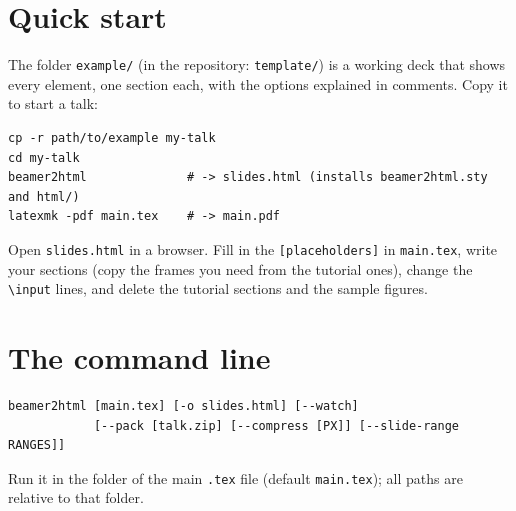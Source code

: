 \documentclass[a4paper,11pt]{article}
\newcommand\cs[1]{\texttt{\textbackslash #1}}
\newcommand\file[1]{\texttt{#1}}
\begin{document}
\section{Quick start}

The folder \file{example/} (in the repository: \file{template/}) is a
working deck that shows every element, one section each, with the options
explained in comments. Copy it to start a talk:
\begin{Verbatim}
cp -r path/to/example my-talk
cd my-talk
beamer2html              # -> slides.html (installs beamer2html.sty and html/)
latexmk -pdf main.tex    # -> main.pdf
\end{Verbatim}
Open \file{slides.html} in a browser. Fill in the \texttt{[placeholders]} in
\file{main.tex}, write your sections (copy the frames you need from the
tutorial ones), change the \cs{input} lines, and delete the tutorial
sections and the sample figures.

\section{The command line}

\begin{Verbatim}
beamer2html [main.tex] [-o slides.html] [--watch]
            [--pack [talk.zip] [--compress [PX]] [--slide-range RANGES]]
\end{Verbatim}
Run it in the folder of the main \file{.tex} file (default
\file{main.tex}); all paths are relative to that folder.
\end{document}
